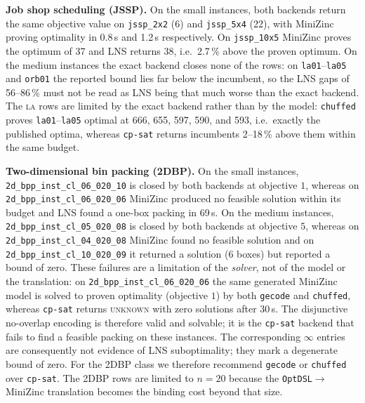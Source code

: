 \documentclass[11pt,a4paper]{article}
\begin{document}
\textbf{Job shop scheduling (JSSP).}
On the small instances, both backends return the same objective value on
\texttt{jssp\_2x2} (6) and \texttt{jssp\_5x4} (22), with MiniZinc proving
optimality in 0.8\,s and 1.2\,s respectively.
On \texttt{jssp\_10x5} MiniZinc proves the optimum of 37 and LNS returns 38,
i.e.\ 2.7\,\% above the proven optimum.
On the medium instances the exact backend closes none of the rows: on
\texttt{la01}--\texttt{la05} and \texttt{orb01} the reported bound lies far
below the incumbent, so the LNS gaps of 56--86\,\% must not be read as LNS
being that much worse than the exact backend.
The \textsc{la} rows are limited by the exact backend rather than by the
model: \texttt{chuffed} proves \texttt{la01}--\texttt{la05} optimal at 666,
655, 597, 590, and 593, i.e.\ exactly the published optima, whereas
\texttt{cp-sat} returns incumbents 2--18\,\% above them within the same
budget.

\begin{sloppypar}
\textbf{Two-dimensional bin packing (2DBP).}
On the small instances, \texttt{2d\_bpp\_inst\_cl\_06\_020\_10} is closed by
both backends at objective $1$, whereas on
\texttt{2d\_bpp\_inst\_cl\_06\_020\_06} MiniZinc produced no feasible solution
within its budget and LNS found a one-box packing in 69\,s.
On the medium instances, \texttt{2d\_bpp\_inst\_cl\_05\_020\_08} is closed by
both backends at objective $5$, whereas on
\texttt{2d\_bpp\_inst\_cl\_04\_020\_08} MiniZinc found no feasible solution and
on \texttt{2d\_bpp\_inst\_cl\_10\_020\_09} it returned a solution (6 boxes)
but reported a bound of zero.
These failures are a limitation of the \emph{solver}, not of the model or the
translation: on \texttt{2d\_bpp\_inst\_cl\_06\_020\_06} the same generated
MiniZinc model is solved to proven optimality (objective $1$) by both
\texttt{gecode} and \texttt{chuffed}, whereas \texttt{cp-sat} returns
\textsc{unknown} with zero solutions after $30$\,s.
The disjunctive no-overlap encoding is therefore valid and solvable; it is
the \texttt{cp-sat} backend that fails to find a feasible packing on these
instances.
The corresponding $\infty$ entries are consequently not evidence of LNS
suboptimality; they mark a degenerate bound of zero.
For the 2DBP class we therefore recommend \texttt{gecode} or
\texttt{chuffed} over \texttt{cp-sat}.
The 2DBP rows are limited to $n=20$ because the \texttt{OptDSL}$\to$MiniZinc
translation becomes the binding cost beyond that size.
\end{sloppypar}
\end{document}
